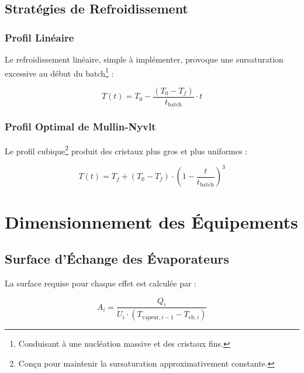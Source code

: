 \documentclass[12pt,a4paper,twoside]{article}
\begin{document}
\subsection{Stratégies de Refroidissement}

\subsubsection{Profil Linéaire}

Le refroidissement linéaire, simple à implémenter, provoque une sursaturation excessive au début du batch\footnote{Conduisant à une nucléation massive et des cristaux fins.} :

\begin{equation}
T(t) = T_0 - \frac{(T_0 - T_f)}{t_{\text{batch}}} \cdot t
\end{equation}

\subsubsection{Profil Optimal de Mullin-Nyvlt}

Le profil cubique\footnote{Conçu pour maintenir la sursaturation approximativement constante.} produit des cristaux plus gros et plus uniformes :

\begin{equation}
\boxed{T(t) = T_f + (T_0 - T_f) \cdot \left(1 - \frac{t}{t_{\text{batch}}}\right)^3}
\label{eq:optimal_cooling}
\end{equation}

\section{Dimensionnement des Équipements}

\subsection{Surface d'Échange des Évaporateurs}

La surface requise pour chaque effet est calculée par :

\begin{equation}
\boxed{A_i = \frac{Q_i}{U_i \cdot (T_{\text{vapeur},i-1} - T_{\text{eb},i})}}
\label{eq:area_evap}
\end{equation}
\end{document}
